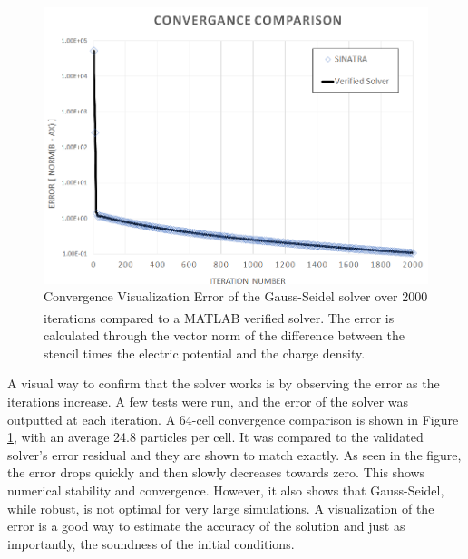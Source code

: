 \begin{figure}
\includegraphics[width=.85\textwidth]{figures/convergance.png}
\centering
\caption[Convergence Visualization]{Convergence Visualization \textmd{Error of the Gauss-Seidel solver over 2000 iterations compared to a MATLAB\textsuperscript{\textregistered} verified solver. The error is calculated through the vector norm of the difference between the stencil times the electric potential and the charge density. }}
\label{fig:error64}
\end{figure}

\indent A visual way to confirm that the solver works is by observing the error as the iterations increase. A few tests were run, and the error of the solver was outputted at each iteration. A 64-cell convergence comparison is shown in Figure \ref{fig:error64}, with an average 24.8 particles per cell. It was compared to the validated solver's error residual and they are shown to match exactly. As seen in the figure, the error drops quickly and then slowly decreases towards zero. This shows numerical stability and convergence. However, it also shows that Gauss-Seidel, while robust, is not optimal for very large simulations. A visualization of the error is a good way to estimate the accuracy of the solution and just as importantly, the soundness of the initial conditions. 

